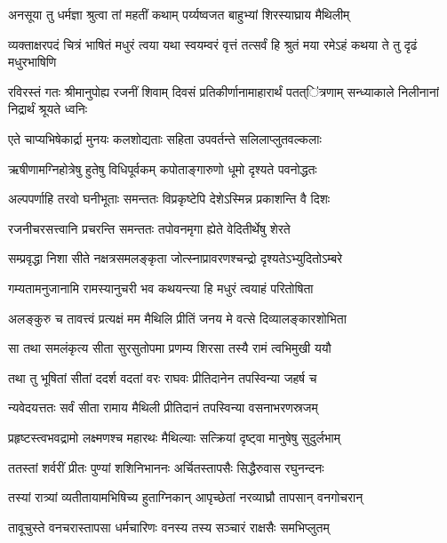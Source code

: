 
\twolineshloka
{अनसूया तु धर्मज्ञा श्रुत्वा तां महतीं कथाम्}
{पर्य्यष्वजत बाहुभ्यां शिरस्याघ्राय मैथिलीम्} %

\threelineshloka
{व्यक्ताक्षरपदं चित्रं भाषितं मधुरं त्वया}
{यथा स्वयम्वरं वृत्तं तत्सर्वं हि श्रुतं मया}
{रमेऽहं कथया ते तु दृढं मधुरभाषिणि} %

\threelineshloka
{रविरस्तं गतः श्रीमानुपोह्य रजनीं शिवाम्}
{दिवसं प्रतिकीर्णानामाहारार्थं पतत्ऺित्रणाम्}
{सन्ध्याकाले निलीनानां निद्रार्थं श्रूयते ध्वनिः} %

\twolineshloka
{एते चाप्यभिषेकार्द्रा मुनयः कलशोद्यताः}
{सहिता उपवर्तन्ते सलिलाप्लुतवल्कलाः} %

\twolineshloka
{ऋषीणामग्निहोत्रेषु हुतेषु विधिपूर्वकम्}
{कपोताङ्गारुणो धूमो दृश्यते पवनोद्धतः} %

\twolineshloka
{अल्पपर्णाहि तरवो घनीभूताः समन्ततः}
{विप्रकृष्टेपि देशेऽस्मिन्न प्रकाशन्ति वै दिशः} %

\twolineshloka
{रजनीचरसत्त्वानि प्रचरन्ति समन्ततः}
{तपोवनमृगा ह्येते वेदितीर्थेषु शेरते} %

\twolineshloka
{सम्प्रवृद्धा निशा सीते नक्षत्रसमलङ्कृता}
{जोत्स्नाप्रावरणश्चन्द्रो दृश्यतेऽभ्युदितोऽम्बरे} %

\twolineshloka
{गम्यतामनुजानामि रामस्यानुचरी भव}
{कथयन्त्या हि मधुरं त्वयाहं परितोषिता} %

\twolineshloka
{अलङ्कुरु च तावत्त्वं प्रत्यक्षं मम मैथिलि}
{प्रीतिं जनय मे वत्से दिव्यालङ्कारशोभिता} %

\twolineshloka
{सा तथा समलंकृत्य सीता सुरसुतोपमा}
{प्रणम्य शिरसा तस्यै रामं त्वभिमुखी ययौ} %

\twolineshloka
{तथा तु भूषितां सीतां ददर्श वदतां वरः}
{राघवः प्रीतिदानेन तपस्विन्या जहर्ष च} %

\twolineshloka
{न्यवेदयत्ततः सर्वं सीता रामाय मैथिली}
{प्रीतिदानं तपस्विन्या वसनाभरणस्रजम्} %

\twolineshloka
{प्रहृष्टस्त्वभवद्रामो लक्ष्मणश्च महारथः}
{मैथिल्याः सत्क्रियां दृष्ट्वा मानुषेषु सुदुर्लभाम्} %

\twolineshloka
{ततस्तां शर्वरीं प्रीतः पुण्यां शशिनिभाननः}
{अर्चितस्तापसैः सिद्धैरुवास रघुनन्दनः} %

\twolineshloka
{तस्यां रात्र्यां व्यतीतायामभिषिच्य हुताग्निकान्}
{आपृच्छेतां नरव्याघ्रौ तापसान् वनगोचरान्} %

\twolineshloka
{तावूचुस्ते वनचरास्तापसा धर्मचारिणः}
{वनस्य तस्य सञ्चारं राक्षसैः समभिप्लुतम्} %

